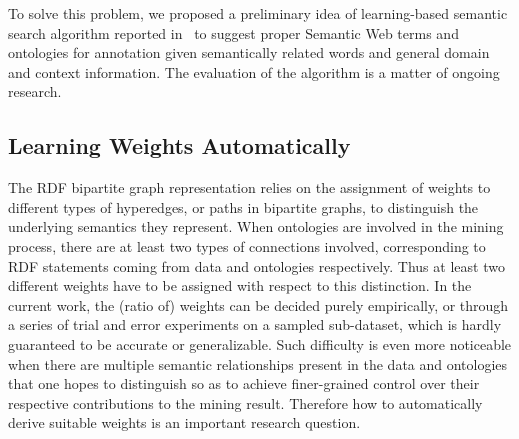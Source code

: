To solve this problem, we proposed a preliminary idea of learning-based semantic search algorithm reported in~\cite{liu2010} to suggest proper Semantic Web terms and ontologies for annotation given semantically related words and general domain and context information. The evaluation of the algorithm is a matter of ongoing research.



\subsection{Learning Weights Automatically}
The RDF bipartite graph representation relies on the assignment of weights to different types of hyperedges, or paths in bipartite graphs, to distinguish the underlying semantics they represent. When ontologies are involved in the mining process, there are at least two types of connections involved, corresponding to RDF statements coming from data and ontologies respectively. Thus at least two different weights have to be assigned with respect to this distinction. In the current work, the (ratio of) weights can be decided purely empirically, or through a series of trial and error experiments on a sampled sub-dataset, which is hardly guaranteed to be accurate or generalizable. Such difficulty is even more noticeable when there are multiple semantic relationships present in the data and ontologies that one hopes to distinguish so as to achieve finer-grained control over their respective contributions to the mining result. Therefore how to automatically derive suitable weights is an important research question.

